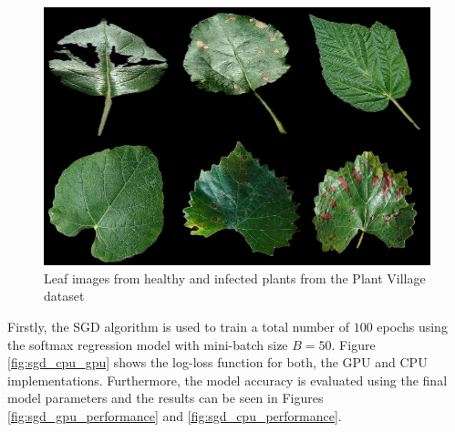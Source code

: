 \documentclass[conference]{IEEEtran}
\begin{document}
\begin{figure}
	\includegraphics[width=\hsize]{figures/plant_village_subset}
	\caption{Leaf images from healthy and infected plants from the Plant Village dataset}
	\label{fig:plantvillagesubset}
\end{figure}


Firstly, the SGD algorithm is used to train a total number of $100$ epochs using the softmax regression model with mini-batch size $B=50$. Figure \ref{fig:sgd_cpu_gpu} shows the log-loss function for both, the GPU and CPU implementations. Furthermore, the model accuracy is evaluated using the final model parameters and the results can be seen in Figures \ref{fig:sgd_gpu_performance} and \ref{fig:sgd_cpu_performance}.   
\end{document}
